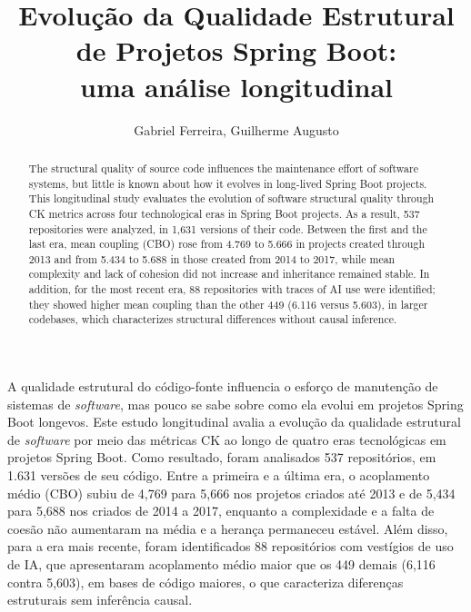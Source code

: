\documentclass[12pt]{article}
\title{Evolução da Qualidade Estrutural de Projetos Spring Boot:\\uma análise longitudinal}
\author{Gabriel Ferreira\inst{1}, Guilherme Augusto\inst{1}}
\begin{document}
\maketitle

\begin{abstract}
The structural quality of source code influences the maintenance effort of software systems, but little is known about how it evolves in long-lived Spring Boot projects. This longitudinal study evaluates the evolution of software structural quality through CK metrics across four technological eras in Spring Boot projects. As a result, 537 repositories were analyzed, in 1,631 versions of their code. Between the first and the last era, mean coupling (CBO) rose from 4.769 to 5.666 in projects created through 2013 and from 5.434 to 5.688 in those created from 2014 to 2017, while mean complexity and lack of cohesion did not increase and inheritance remained stable. In addition, for the most recent era, 88 repositories with traces of AI use were identified; they showed higher mean coupling than the other 449 (6.116 versus 5.603), in larger codebases, which characterizes structural differences without causal inference.
\end{abstract}

\begin{resumo}
A qualidade estrutural do código-fonte influencia o esforço de manutenção de sistemas de \emph{software}, mas pouco se sabe sobre como ela evolui em projetos Spring Boot longevos. Este estudo longitudinal avalia a evolução da qualidade estrutural de \emph{software} por meio das métricas CK ao longo de quatro eras tecnológicas em projetos Spring Boot. Como resultado, foram analisados 537 repositórios, em 1.631 versões de seu código. Entre a primeira e a última era, o acoplamento médio (CBO) subiu de 4,769 para 5,666 nos projetos criados até 2013 e de 5,434 para 5,688 nos criados de 2014 a 2017, enquanto a complexidade e a falta de coesão não aumentaram na média e a herança permaneceu estável. Além disso, para a era mais recente, foram identificados 88 repositórios com vestígios de uso de IA, que apresentaram acoplamento médio maior que os 449 demais (6,116 contra 5,603), em bases de código maiores, o que caracteriza diferenças estruturais sem inferência causal.
\end{resumo}
\end{document}
